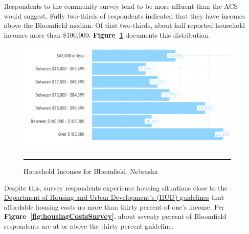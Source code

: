 \pagebreak
\noindent Respondents to the community survey tend to be more affluent than the ACS would suggest. Fully two-thirds of respondents indicated that they have incomes above the Bloomfield median. Of that two-thirds, about half reported household incomes more than \$100,000. \textbf{Figure~\ref{fig:householdIncomes}} documents this distribution.

\begin{figure}[H]
\centering
\begin{framed}
    \caption{Household Incomes for Bloomfield, Nebraska}
    \label{fig:householdIncomes}
    \includegraphics[width=\linewidth]{figures/survey_respondent_incomes.png}
    \rule[-5pt]{\linewidth}{0.4pt}
\end{framed}
\end{figure}

\pagebreak
\noindent Despite this, survey respondents experience housing situations close to the \href{https://www.hudexchange.info/programs/home/home-income-limits}{Department of Housing and Urban Development's (HUD) guidelines} that affordable housing costs no more than thirty percent of one's income. Per \textbf{Figure~\ref{fig:housingCostsSurvey}}, about seventy percent of Bloomfield respondents are at or above the thirty percent guideline.


